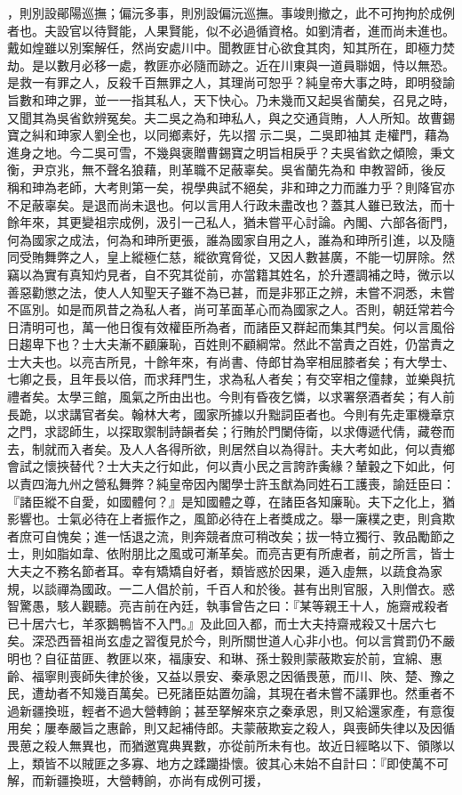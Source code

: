 \begin{pinyinscope}
，則別設鄖陽巡撫；偏沅多事，則別設偏沅巡撫。事竣則撤之，此不可拘拘於成例者也。夫設官以待賢能，人果賢能，似不必過循資格。如劉清者，進而尚未進也。戴如煌雖以別案解任，然尚安處川中。聞教匪甘心欲食其肉，知其所在，即極力焚劫。是以數月必移一處，教匪亦必隨而跡之。近在川東與一道員聯姻，恃以無恐。是救一有罪之人，反殺千百無罪之人，其理尚可恕乎？純皇帝大事之時，即明發諭旨數和珅之罪，並一一指其私人，天下快心。乃未幾而又起吳省蘭矣，召見之時，又聞其為吳省欽辨冤矣。夫二吳之為和珅私人，與之交通貨賄，人人所知。故曹錫寶之糾和珅家人劉全也，以同鄉素好，先以摺示二吳，二吳即袖其走權門，藉為進身之地。今二吳可雪，不幾與褒贈曹錫寶之明旨相戾乎？夫吳省欽之傾險，秉文衡，尹京兆，無不聲名狼藉，則革職不足蔽辜矣。吳省蘭先為和申教習師，後反稱和珅為老師，大考則第一矣，視學典試不絕矣，非和珅之力而誰力乎？則降官亦不足蔽辜矣。是退而尚未退也。何以言用人行政未盡改也？蓋其人雖已致法，而十餘年來，其更變祖宗成例，汲引一己私人，猶未嘗平心討論。內閣、六部各衙門，何為國家之成法，何為和珅所更張，誰為國家自用之人，誰為和珅所引進，以及隨同受賄舞弊之人，皇上縱極仁慈，縱欲寬脅從，又因人數甚廣，不能一切屏除。然竊以為實有真知灼見者，自不究其從前，亦當籍其姓名，於升遷調補之時，微示以善惡勸懲之法，使人人知聖天子雖不為已甚，而是非邪正之辨，未嘗不洞悉，未嘗不區別。如是而夙昔之為私人者，尚可革面革心而為國家之人。否則，朝廷常若今日清明可也，萬一他日復有效權臣所為者，而諸臣又群起而集其門矣。何以言風俗日趨卑下也？士大夫漸不顧廉恥，百姓則不顧綱常。然此不當責之百姓，仍當責之士大夫也。以亮吉所見，十餘年來，有尚書、侍郎甘為宰相屈膝者矣；有大學士、七卿之長，且年長以倍，而求拜門生，求為私人者矣；有交宰相之僮隸，並樂與抗禮者矣。太學三館，風氣之所由出也。今則有昏夜乞憐，以求署祭酒者矣；有人前長跪，以求講官者矣。翰林大考，國家所據以升黜詞臣者也。今則有先走軍機章京之門，求認師生，以探取禦制詩韻者矣；行賄於門闌侍衛，以求傳遞代倩，藏卷而去，制就而入者矣。及人人各得所欲，則居然自以為得計。夫大考如此，何以責鄉會試之懷挾替代？士大夫之行如此，何以責小民之言誇詐夤緣？輦轂之下如此，何以責四海九州之營私舞弊？純皇帝因內閣學士許玉猷為同姓石工護喪，諭廷臣曰：『諸臣縱不自愛，如國體何？』是知國體之尊，在諸臣各知廉恥。夫下之化上，猶影響也。士氣必待在上者振作之，風節必待在上者獎成之。舉一廉樸之吏，則貪欺者庶可自愧矣；進一恬退之流，則奔競者庶可稍改矣；拔一特立獨行、敦品勵節之士，則如脂如韋、依附朋比之風或可漸革矣。而亮吉更有所慮者，前之所言，皆士大夫之不務名節者耳。幸有矯矯自好者，類皆惑於因果，遁入虛無，以蔬食為家規，以談禪為國政。一二人倡於前，千百人和於後。甚有出則官服，入則僧衣。惑智驚愚，駭人觀聽。亮吉前在內廷，執事曾告之曰：『某等親王十人，施齋戒殺者已十居六七，羊豕鵝鴨皆不入門。』及此回入都，而士大夫持齋戒殺又十居六七矣。深恐西晉祖尚玄虛之習復見於今，則所關世道人心非小也。何以言賞罰仍不嚴明也？自征苗匪、教匪以來，福康安、和琳、孫士毅則蒙蔽欺妄於前，宜綿、惠齡、福寧則喪師失律於後，又益以景安、秦承恩之因循畏葸，而川、陜、楚、豫之民，遭劫者不知幾百萬矣。已死諸臣姑置勿論，其現在者未嘗不議罪也。然重者不過新疆換班，輕者不過大營轉餉；甚至拏解來京之秦承恩，則又給還家產，有意復用矣；屢奉嚴旨之惠齡，則又起補侍郎。夫蒙蔽欺妄之殺人，與喪師失律以及因循畏葸之殺人無異也，而猶邀寬典異數，亦從前所未有也。故近日經略以下、領隊以上，類皆不以賊匪之多寡、地方之蹂躪掛懷。彼其心未始不自計曰：『即使萬不可解，而新疆換班，大營轉餉，亦尚有成例可援，
\end{pinyinscope}
